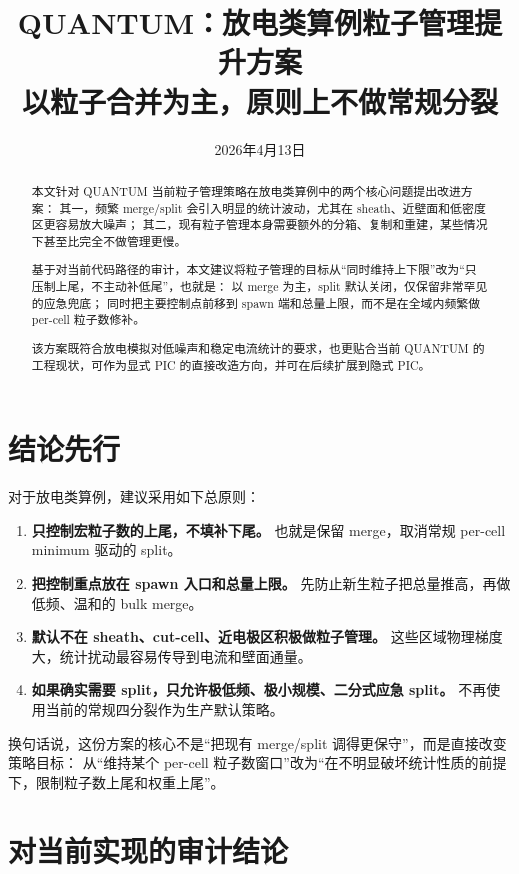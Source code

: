 \documentclass[UTF8,11pt,a4paper]{ctexart}
\title{QUANTUM：放电类算例粒子管理提升方案\\
{\large 以粒子合并为主，原则上不做常规分裂}}
\author{}
\date{2026年4月13日}
\begin{document}
\maketitle

\begin{abstract}
本文针对 QUANTUM 当前粒子管理策略在放电类算例中的两个核心问题提出改进方案：
其一，频繁 merge/split 会引入明显的统计波动，尤其在 sheath、近壁面和低密度区更容易放大噪声；
其二，现有粒子管理本身需要额外的分箱、复制和重建，某些情况下甚至比完全不做管理更慢。

基于对当前代码路径的审计，本文建议将粒子管理的目标从“同时维持上下限”改为“只压制上尾，不主动补低尾”，也就是：
以 merge 为主，split 默认关闭，仅保留非常罕见的应急兜底；
同时把主要控制点前移到 spawn 端和总量上限，而不是在全域内频繁做 per-cell 粒子数修补。

该方案既符合放电模拟对低噪声和稳定电流统计的要求，也更贴合当前 QUANTUM 的工程现状，可作为显式 PIC 的直接改造方向，并可在后续扩展到隐式 PIC。
\end{abstract}

\tableofcontents

\section{结论先行}

对于放电类算例，建议采用如下总原则：
\begin{enumerate}[itemsep=3pt]
  \item \textbf{只控制宏粒子数的上尾，不填补下尾。} 也就是保留 merge，取消常规 per-cell minimum 驱动的 split。
  \item \textbf{把控制重点放在 spawn 入口和总量上限。} 先防止新生粒子把总量推高，再做低频、温和的 bulk merge。
  \item \textbf{默认不在 sheath、cut-cell、近电极区积极做粒子管理。} 这些区域物理梯度大，统计扰动最容易传导到电流和壁面通量。
  \item \textbf{如果确实需要 split，只允许极低频、极小规模、二分式应急 split。} 不再使用当前的常规四分裂作为生产默认策略。
\end{enumerate}

换句话说，这份方案的核心不是“把现有 merge/split 调得更保守”，而是直接改变策略目标：
从“维持某个 per-cell 粒子数窗口”改为“在不明显破坏统计性质的前提下，限制粒子数上尾和权重上尾”。

\section{对当前实现的审计结论}
\end{document}
